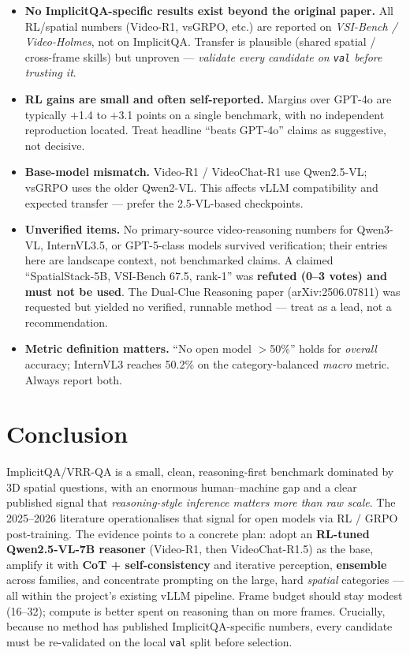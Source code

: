 \documentclass[11pt]{article}
\begin{document}
\begin{itemize}[leftmargin=1.4em,itemsep=2pt]
  \item \textbf{No ImplicitQA-specific results exist beyond the original paper.}
  All RL/spatial numbers (Video-R1, vsGRPO, etc.) are reported on \emph{VSI-Bench /
  Video-Holmes}, not on ImplicitQA. Transfer is plausible (shared spatial /
  cross-frame skills) but unproven --- \emph{validate every candidate on
  \texttt{val} before trusting it}.
  \item \textbf{RL gains are small and often self-reported.} Margins over GPT-4o
  are typically $+$1.4 to $+$3.1 points on a single benchmark, with no independent
  reproduction located. Treat headline ``beats GPT-4o'' claims as suggestive, not
  decisive.
  \item \textbf{Base-model mismatch.} Video-R1 / VideoChat-R1 use Qwen2.5-VL;
  vsGRPO uses the older Qwen2-VL. This affects vLLM compatibility and expected
  transfer --- prefer the 2.5-VL-based checkpoints.
  \item \textbf{Unverified items.} No primary-source video-reasoning numbers for
  Qwen3-VL, InternVL3.5, or GPT-5-class models survived verification; their entries
  here are landscape context, not benchmarked claims. A claimed ``SpatialStack-5B,
  VSI-Bench 67.5, rank-1'' was \textbf{refuted (0--3 votes) and must not be used}.
  The Dual-Clue Reasoning paper (arXiv:2506.07811) was requested but yielded no
  verified, runnable method --- treat as a lead, not a recommendation.
  \item \textbf{Metric definition matters.} ``No open model $>$50\%'' holds for
  \emph{overall} accuracy; InternVL3 reaches 50.2\% on the category-balanced
  \emph{macro} metric. Always report both.
\end{itemize}

\section{Conclusion}
ImplicitQA/VRR-QA is a small, clean, reasoning-first benchmark dominated by 3D
spatial questions, with an enormous human--machine gap and a clear published
signal that \emph{reasoning-style inference matters more than raw scale}. The
2025--2026 literature operationalises that signal for open models via RL / GRPO
post-training. The evidence points to a concrete plan: adopt an \textbf{RL-tuned
Qwen2.5-VL-7B reasoner} (Video-R1, then VideoChat-R1.5) as the base, amplify it
with \textbf{CoT + self-consistency} and iterative perception, \textbf{ensemble}
across families, and concentrate prompting on the large, hard \emph{spatial}
categories --- all within the project's existing vLLM pipeline. Frame budget should
stay modest (16--32); compute is better spent on reasoning than on more frames.
Crucially, because no method has published ImplicitQA-specific numbers, every
candidate must be re-validated on the local \texttt{val} split before selection.
\end{document}
